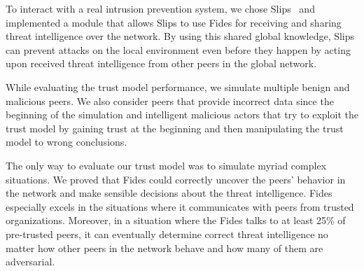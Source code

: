 To interact with a real intrusion prevention system, we chose Slips~\cite{slips} and implemented a module that allows Slips to use Fides for receiving and sharing threat intelligence over the network. 
By using this shared global knowledge, Slips can prevent attacks on the local environment even before they happen by acting upon received threat intelligence from other peers in the global network.

While evaluating the trust model performance, we simulate multiple benign and malicious peers. We also consider peers that provide incorrect data since the beginning of the simulation and intelligent malicious actors that try to exploit the trust model by gaining trust at the beginning and then manipulating the trust model to wrong conclusions.

The only way to evaluate our trust model was to simulate myriad complex situations. We proved that Fides could correctly uncover the peers' behavior in the network and make sensible decisions about the threat intelligence. 
Fides especially excels in the situations where it communicates with peers from trusted organizations.
Moreover, in a situation where the Fides talks to at least 25\% of pre-trusted peers, it can eventually determine correct threat intelligence no matter how other peers in the network behave and how many of them are adversarial.

